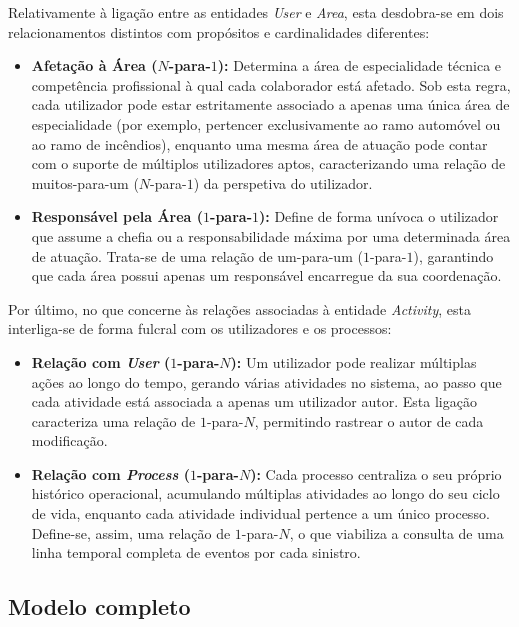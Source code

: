 Relativamente à ligação entre as entidades \textit{User} e \textit{Area}, esta desdobra-se em dois relacionamentos distintos com propósitos e cardinalidades diferentes:
\begin{itemize}
    \item \textbf{Afetação à Área ($N$-para-$1$):} Determina a área de especialidade técnica e competência profissional à qual cada colaborador está afetado. Sob esta regra, cada utilizador pode estar estritamente associado a apenas uma única área de especialidade (por exemplo, pertencer exclusivamente ao ramo automóvel ou ao ramo de incêndios), enquanto uma mesma área de atuação pode contar com o suporte de múltiplos utilizadores aptos, caracterizando uma relação de muitos-para-um ($N$-para-$1$) da perspetiva do utilizador.
    \item \textbf{Responsável pela Área ($1$-para-$1$):} Define de forma unívoca o utilizador que assume a chefia ou a responsabilidade máxima por uma determinada área de atuação. Trata-se de uma relação de um-para-um ($1$-para-$1$), garantindo que cada área possui apenas um responsável encarregue da sua coordenação.
\end{itemize}

Por último, no que concerne às relações associadas à entidade \textit{Activity}, esta interliga-se de forma fulcral com os utilizadores e os processos:
\begin{itemize}
    \item \textbf{Relação com \textit{User} ($1$-para-$N$):} Um utilizador pode realizar múltiplas ações ao longo do tempo, gerando várias atividades no sistema, ao passo que cada atividade está associada a apenas um utilizador autor. Esta ligação caracteriza uma relação de $1$-para-$N$, permitindo rastrear o autor de cada modificação.
    \item \textbf{Relação com \textit{Process} ($1$-para-$N$):} Cada processo centraliza o seu próprio histórico operacional, acumulando múltiplas atividades ao longo do seu ciclo de vida, enquanto cada atividade individual pertence a um único processo. Define-se, assim, uma relação de $1$-para-$N$, o que viabiliza a consulta de uma linha temporal completa de eventos por cada sinistro.
\end{itemize}


\newpage


\subsection{Modelo completo}

